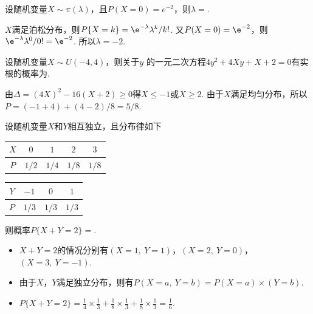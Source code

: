 \begin{problem}
    设随机变量$X\sim\pi(\lambda)$，且$P(X=0)=e^{-2}$，则$\lambda=$.
\end{problem}
\begin{solution}
    $X$满足泊松分布，则$P\{X=k\}=\e^{-\lambda}\lambda^k/k!$. 又$P(X=0)=\e^{-2}$，则$\e^{-\lambda}\lambda^0/0!=\e^{-2}$. 所以$\lambda=-2$.
\end{solution}

\begin{problem}
    设随机变量$X\sim U(-4,4)$，则关于$y$ 的一元二次方程$4y^2+4Xy+X+2=0$有实根的概率为.
\end{problem}
\begin{solution}
    由$\Delta=(4X)^2-16(X+2)\geq0$得$X\leq-1$或$X\geq2$. 由于$X$满足均匀分布，所以$P=(-1+4)+(4-2)/8=5/8$.
\end{solution}

\begin{problem}
    设随机变量$X$和$Y$相互独立，且分布律如下
    \begin{table}[htbp]
        \begin{minipage}[c]{.48\textwidth}
            \centering
            \begin{tabular}{ccccc}
                \toprule
                $X$ & $0$ & $1$ & $2$ & $3$\\
                \midrule
                $P$ & $1/2$ & $1/4$ & $1/8$ & $1/8$\\
                \bottomrule
            \end{tabular}
        \end{minipage}
        \hfill
        \begin{minipage}[c]{.48\textwidth}
            \centering
            \begin{tabular}{cccc}
                \toprule
                $Y$ & $-1$ & $0$ & $1$\\
                \midrule
                $P$ & $1/3$ & $1/3$ & $1/3$\\
                \bottomrule
            \end{tabular}
        \end{minipage}
    \end{table}

    则概率$P\{X+Y=2\}=$.
\end{problem}
\begin{solution}\leavevmode
    \begin{itemize}
        \item $X+Y=2$的情况分别有$(X=1,\ Y=1)$，$(X=2,\ Y=0)$，$(X=3,\ Y=-1)$.
        \item 由于$X$，$Y$满足独立分布，则有$P(X=a,\ Y=b)=P(X=a)\times(Y=b)$.
        \item $P\{X+Y=2\}=\frac14\times\frac13+\frac18\times\frac13+\frac18\times\frac13=\frac16$.
    \end{itemize}
\end{solution}

